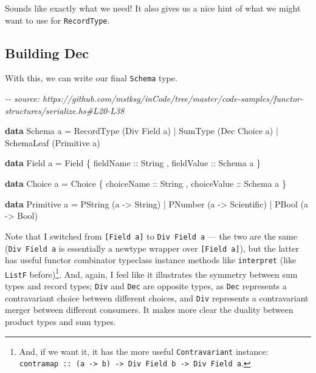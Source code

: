 \documentclass[]{article}
\newenvironment{Shaded}{}{}
\newcommand{\CommentTok}[1]{\textcolor[rgb]{0.38,0.63,0.69}{\textit{#1}}}
\newcommand{\DataTypeTok}[1]{\textcolor[rgb]{0.56,0.13,0.00}{#1}}
\newcommand{\KeywordTok}[1]{\textcolor[rgb]{0.00,0.44,0.13}{\textbf{#1}}}
\newcommand{\NormalTok}[1]{#1}
\newcommand{\OperatorTok}[1]{\textcolor[rgb]{0.40,0.40,0.40}{#1}}
\newcommand{\OtherTok}[1]{\textcolor[rgb]{0.00,0.44,0.13}{#1}}
\begin{document}
Sounds like exactly what we need! It also gives us a nice hint of what we might
want to use for \texttt{RecordType}.

\hypertarget{building-dec}{%
\subsection{Building Dec}\label{building-dec}}

With this, we can write our final \texttt{Schema} type.

\begin{Shaded}
\begin{Highlighting}[]
\CommentTok{{-}{-} source: https://github.com/mstksg/inCode/tree/master/code{-}samples/functor{-}structures/serialize.hs\#L20{-}L38}

\KeywordTok{data} \DataTypeTok{Schema}\NormalTok{ a }\OtherTok{=}
      \DataTypeTok{RecordType}\NormalTok{  (}\DataTypeTok{Div} \DataTypeTok{Field}\NormalTok{ a)}
    \OperatorTok{|} \DataTypeTok{SumType}\NormalTok{     (}\DataTypeTok{Dec} \DataTypeTok{Choice}\NormalTok{ a)}
    \OperatorTok{|} \DataTypeTok{SchemaLeaf}\NormalTok{  (}\DataTypeTok{Primitive}\NormalTok{ a)}

\KeywordTok{data} \DataTypeTok{Field}\NormalTok{ a }\OtherTok{=} \DataTypeTok{Field}
\NormalTok{    \{}\OtherTok{ fieldName  ::} \DataTypeTok{String}
\NormalTok{    ,}\OtherTok{ fieldValue ::} \DataTypeTok{Schema}\NormalTok{ a}
\NormalTok{    \}}

\KeywordTok{data} \DataTypeTok{Choice}\NormalTok{ a }\OtherTok{=} \DataTypeTok{Choice}
\NormalTok{    \{}\OtherTok{ choiceName  ::} \DataTypeTok{String}
\NormalTok{    ,}\OtherTok{ choiceValue ::} \DataTypeTok{Schema}\NormalTok{ a}
\NormalTok{    \}}

\KeywordTok{data} \DataTypeTok{Primitive}\NormalTok{ a }\OtherTok{=}
      \DataTypeTok{PString}\NormalTok{ (a }\OtherTok{{-}>} \DataTypeTok{String}\NormalTok{)}
    \OperatorTok{|} \DataTypeTok{PNumber}\NormalTok{ (a }\OtherTok{{-}>} \DataTypeTok{Scientific}\NormalTok{)}
    \OperatorTok{|} \DataTypeTok{PBool}\NormalTok{   (a }\OtherTok{{-}>} \DataTypeTok{Bool}\NormalTok{)}
\end{Highlighting}
\end{Shaded}

Note that I switched from \texttt{{[}Field\ a{]}} to \texttt{Div\ Field\ a} ---
the two are the same (\texttt{Div\ Field\ a} is essentially a newtype wrapper
over \texttt{{[}Field\ a{]}}), but the latter has useful functor combinator
typeclass instance methods like \texttt{interpret} (like \texttt{ListF}
before)\footnote{And, if we want it, it has the more useful
  \texttt{Contravariant} instance:
  \texttt{contramap\ ::\ (a\ -\textgreater{}\ b)\ -\textgreater{}\ Div\ Field\ b\ -\textgreater{}\ Div\ Field\ a}.}.
And, again, I feel like it illustrates the symmetry between sum types and record
types; \texttt{Div} and \texttt{Dec} are opposite types, as \texttt{Dec}
represents a contravariant choice between different choices, and \texttt{Div}
represents a contravariant merger between different consumers. It makes more
clear the duality between product types and sum types.
\end{document}
